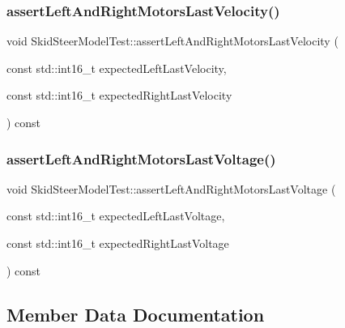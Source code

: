 \subsubsection{\texorpdfstring{assertLeftAndRightMotorsLastVelocity()}{assertLeftAndRightMotorsLastVelocity()}}
{\footnotesize\ttfamily void Skid\+Steer\+Model\+Test\+::assert\+Left\+And\+Right\+Motors\+Last\+Velocity (\begin{DoxyParamCaption}\item[{const std\+::int16\+\_\+t}]{expected\+Left\+Last\+Velocity,  }\item[{const std\+::int16\+\_\+t}]{expected\+Right\+Last\+Velocity }\end{DoxyParamCaption}) const\hspace{0.3cm}{\ttfamily [inline]}}

\mbox{\label{classSkidSteerModelTest_a977356f6e434d76aa0b17e9be1337d10}} 
\subsubsection{\texorpdfstring{assertLeftAndRightMotorsLastVoltage()}{assertLeftAndRightMotorsLastVoltage()}}
{\footnotesize\ttfamily void Skid\+Steer\+Model\+Test\+::assert\+Left\+And\+Right\+Motors\+Last\+Voltage (\begin{DoxyParamCaption}\item[{const std\+::int16\+\_\+t}]{expected\+Left\+Last\+Voltage,  }\item[{const std\+::int16\+\_\+t}]{expected\+Right\+Last\+Voltage }\end{DoxyParamCaption}) const\hspace{0.3cm}{\ttfamily [inline]}}



\subsection{Member Data Documentation}
\mbox{\label{classSkidSteerModelTest_ae5f23d1d7503a67dbf677a17915d3960}} 
